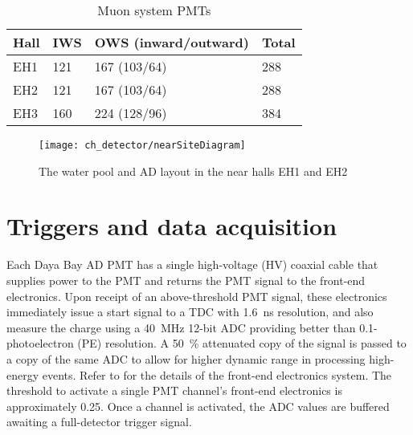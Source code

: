 \begin{table}[ht]
    \centering
    \begin{tabular}[t]{llll}
        \hline
        Hall & IWS & OWS (inward/outward) & Total\\
        \hline
        EH1 & 121 & 167 (103/64) & 288\\
        EH2 & 121 & 167 (103/64) & 288\\
        EH3 & 160 & 224 (128/96) & 384\\
        \hline
    \end{tabular}
    \caption{Muon system PMTs \cite{muonsystem2015}}
    \label{tab:wp_pmts}
\end{table}

\begin{figure}
    \centering
    \texttt{[image: ch\_detector/nearSiteDiagram]}
    \caption{The water pool and AD layout in the near halls EH1 and EH2}
    \label{fig:wpcutout}
\end{figure}



\section{Triggers and data acquisition}
\label{sec:daq}

Each Daya Bay AD PMT has a single high-voltage (HV) coaxial cable
that supplies power to the PMT and returns the PMT signal to the
front-end electronics.
Upon receipt of an above-threshold PMT signal, these electronics immediately
issue a start signal to a TDC with \SI{1.6}{\ns} resolution,
and also measure the charge using a \SI{40}{\MHz} \num{12}-bit ADC
providing better than \num{0.1}-photoelectron (PE) resolution.
A \SI{50}{\percent} attenuated copy of the signal is passed to a copy
of the same ADC to allow for higher dynamic range in processing high-energy
events.
Refer to \cite{sidebyside,ngd2016} for the details
of the front-end electronics system.
The threshold to activate a single PMT channel's front-end electronics
is approximately \SI{0.25}{\pe}.
Once a channel is activated, the ADC values are buffered
awaiting a full-detector trigger signal.

